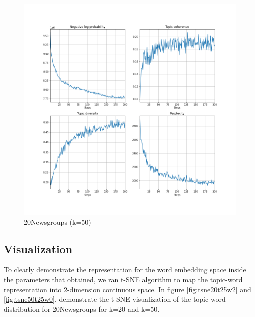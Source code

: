 \begin{figure}
\centering
\includegraphics[width=1\linewidth]{figures/0106/ppl_50t}
\caption{20Newsgroups (k=50)}
\label{fig:ppl50t}
\end{figure}
\subsection{Visualization}
To clearly demonstrate the representation for the word embedding space inside the parameters that obtained, we ran t-SNE algorithm to map the topic-word representation into 2-dimension continuous space. In figure \ref{fig:tsne20t25w2} and \ref{fig:tsne50t25w0}, demonstrate the t-SNE visualization of the topic-word distribution for 20Newsgroups for k=20 and k=50. 

